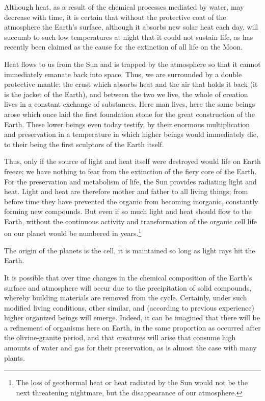 \documentclass[a4paper, 12pt, oneside]{article}
\begin{document}
Although heat, as a result of the chemical processes mediated by water, may decrease with time, it is certain that without the protective coat of the atmosphere the Earth's surface, although it absorbs new solar heat each day, will succumb to such low temperatures at night that it could not sustain life, as has recently been claimed as the cause for the extinction of all life on the Moon.

Heat flows to us from the Sun and is trapped by the atmosphere so that it cannot immediately emanate back into space. Thus, we are surrounded by a double protective mantle: the crust which absorbs heat and the air that holds it back (it is the jacket of the Earth), and between the two we live, the whole of creation lives in a constant exchange of substances. Here man lives, here the same beings arose which once laid the first foundation stone for the great construction of the Earth. These lower beings even today testify, by their enormous multiplication and preservation in a temperature in which higher beings would immediately die, to their being the first sculptors of the Earth itself.

Thus, only if the source of light and heat itself were destroyed would life on Earth freeze; we have nothing to fear from the extinction of the fiery core of the Earth. For the preservation and metabolism of life, the Sun provides radiating light and heat. Light and heat are therefore mother and father to all living things; from before time they have prevented the organic from becoming inorganic, constantly forming new compounds. But even if so much light and heat should flow to the Earth, without the continuous activity and transformation of the organic cell life on our planet would be numbered in years.\footnote{The loss of geothermal heat or heat radiated by the Sun would not be the next threatening nightmare, but the disappearance of our atmosphere.}

The origin of the planets is the cell, it is maintained so long as light rays hit the Earth.

It is possible that over time changes in the chemical composition of the Earth's surface and atmosphere will occur due to the precipitation of solid compounds, whereby building materials are removed from the cycle. Certainly, under such modified living conditions, other similar, and (according to previous experience) higher organized beings will emerge. Indeed, it can be imagined that there will be a refinement of organisms here on Earth, in the same proportion as occurred after the olivine-granite period, and that creatures will arise that consume high amounts of water and gas for their preservation, as is almost the case with many plants.
\clearpage
\end{document}
